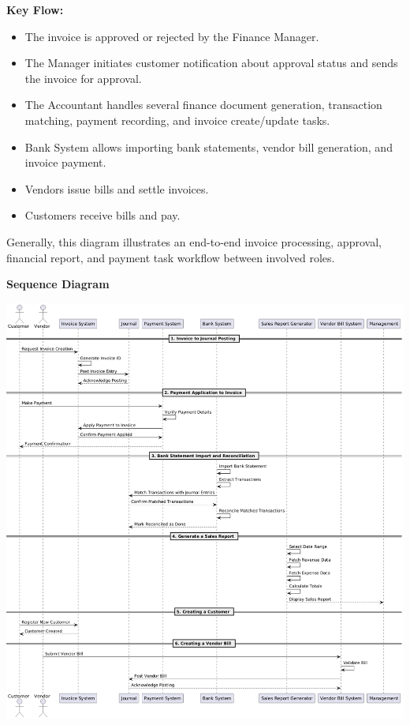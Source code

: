 \documentclass[11pt,a4paper]{article}
\begin{document}
    \noindent\textbf{Key Flow:}
    \begin{itemize}
        \item The invoice is approved or rejected by the Finance Manager.
        \item The Manager initiates customer notification about approval status and sends the invoice for approval.
        \item The Accountant handles several finance document generation, transaction matching, payment recording, and invoice create/update tasks.
        \item Bank System allows importing bank statements, vendor bill generation, and invoice payment.
        \item Vendors issue bills and settle invoices.
        \item Customers receive bills and pay.
    \end{itemize}

    \noindent Generally, this diagram illustrates an end-to-end invoice processing, approval, financial report, and payment task workflow between involved roles.
    \bigskip

\newpage
\noindent\textbf{Sequence Diagram}
\begin{center}
    \includegraphics[width=\linewidth]{diagram/sequence_accounting_diagram.png}
\end{center}
\end{document}
